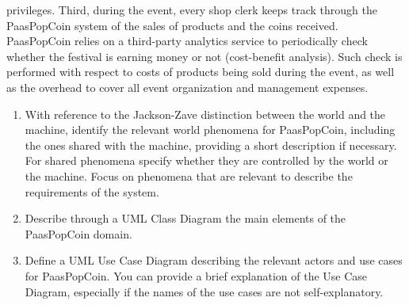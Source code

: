 \documentclass[12pt, a4paper]{report}
\newtheorem[style=M,bodystyle=\normalfont]{theorem}{Theorem}
\newtheorem[style=M,bodystyle=\normalfont]{corollary}{Corollary}
\newtheorem[style=M,bodystyle=\normalfont]{lemma}{Lemma}
\newtheorem[style=M,bodystyle=\normalfont]{definition}{Definition}
\begin{document}
        privileges. Third, during the event, every shop clerk keeps track through the PaasPopCoin system of the sales of products and the coins received. PaasPopCoin relies on a 
        third-party analytics service to periodically check whether the festival is earning money or not (cost-benefit analysis). Such check is performed with respect to costs of 
        products being sold during the event, as well as the overhead to cover all event organization and management expenses. 
        \begin{enumerate}
            \item With reference to the Jackson-Zave distinction between the world and the machine, identify the relevant world phenomena for PaasPopCoin, including the ones shared 
                with the machine, providing a short description if necessary. For shared phenomena specify whether they are controlled by the world or the machine. Focus on phenomena 
                that are relevant to describe the requirements of the system.
            \item Describe through a UML Class Diagram the main elements of the PaasPopCoin domain. 
            \item Define a UML Use Case Diagram describing the relevant actors and use cases for PaasPopCoin. You can provide a brief explanation of the Use Case Diagram, especially 
                if the names of the use cases are not self-explanatory.
        \end{enumerate}
\end{document}
